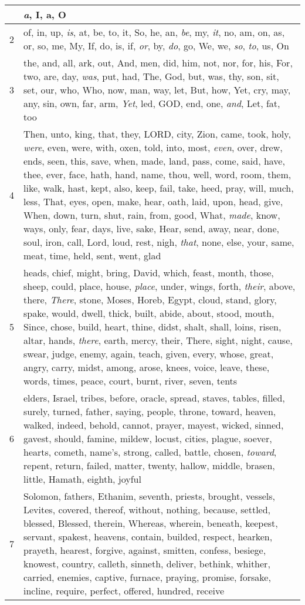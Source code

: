 \begin{longtable}{l|p{3.75in}}
\hline \hline
\endlastfoot
1 & \emph{a}, I, a, O \\ \hline
2 & of, in, up, \emph{is}, at, be, to, it, So, he, an, \emph{be}, my, \emph{it}, no, am, on, as, or, so, me, My, If, do, is, if, \emph{or}, by, \emph{do}, go, We, we, \emph{so}, \emph{to}, us, On \\ \hline
3 & the, and, all, ark, out, And, men, did, him, not, nor, for, his, For, two, are, day, \emph{was}, put, had, The, God, but, was, thy, son, sit, set, our, who, Who, now, man, way, let, But, how, Yet, cry, may, any, sin, own, far, arm, \emph{Yet}, led, GOD, end, one, \emph{and}, Let, fat, too \\ \hline
4 & Then, unto, king, that, they, LORD, city, Zion, came, took, holy, \emph{were}, even, were, with, oxen, told, into, most, \emph{even}, over, drew, ends, seen, this, save, when, made, land, pass, come, said, have, thee, ever, face, hath, hand, name, thou, well, word, room, them, like, walk, hast, kept, also, keep, fail, take, heed, pray, will, much, less, That, eyes, open, make, hear, oath, laid, upon, head, give, When, down, turn, shut, rain, from, good, What, \emph{made}, know, ways, only, fear, days, live, sake, Hear, send, away, near, done, soul, iron, call, Lord, loud, rest, nigh, \emph{that}, none, else, your, same, meat, time, held, sent, went, glad \\ \hline
5 & heads, chief, might, bring, David, which, feast, month, those, sheep, could, place, house, \emph{place}, under, wings, forth, \emph{their}, above, there, \emph{There}, stone, Moses, Horeb, Egypt, cloud, stand, glory, spake, would, dwell, thick, built, abide, about, stood, mouth, Since, chose, build, heart, thine, didst, shalt, shall, loins, risen, altar, hands, \emph{there}, earth, mercy, their, There, sight, night, cause, swear, judge, enemy, again, teach, given, every, whose, great, angry, carry, midst, among, arose, knees, voice, leave, these, words, times, peace, court, burnt, river, seven, tents \\ \hline
6 & elders, Israel, tribes, before, oracle, spread, staves, tables, filled, surely, turned, father, saying, people, throne, toward, heaven, walked, indeed, behold, cannot, prayer, mayest, wicked, sinned, gavest, should, famine, mildew, locust, cities, plague, soever, hearts, cometh, name's, strong, called, battle, chosen, \emph{toward}, repent, return, failed, matter, twenty, hallow, middle, brasen, little, Hamath, eighth, joyful \\ \hline
7 & Solomon, fathers, Ethanim, seventh, priests, brought, vessels, Levites, covered, thereof, without, nothing, because, settled, blessed, Blessed, therein, Whereas, wherein, beneath, keepest, servant, spakest, heavens, contain, builded, respect, hearken, prayeth, hearest, forgive, against, smitten, confess, besiege, knowest, country, calleth, sinneth, deliver, bethink, whither, carried, enemies, captive, furnace, praying, promise, forsake, incline, require, perfect, offered, hundred, receive \\ \hline

\end{longtable}
